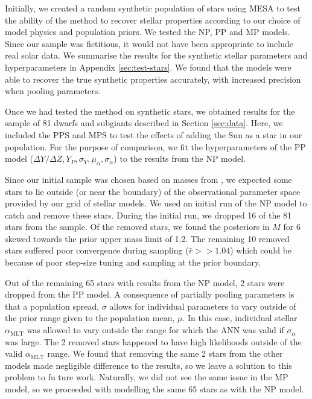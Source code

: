 \documentclass[a4paper,fleqn,usenatbib]{mnras}
\newcommand{\mlt}{\ensuremath{{\alpha_\mathrm{MLT}}}}
\begin{document}
Initially, we created a random synthetic population of stars using \textsc{MESA} to test the ability of the method to recover stellar properties according to our choice of model physics and population priors. We tested the NP, PP and MP models. Since our sample was fictitious, it would not have been appropriate to include real solar data. We summarise the results for the synthetic stellar parameters and hyperparameters in Appendix \ref{sec:test-stars}. We found that the models were able to recover the true synthetic properties accurately, with increased precision when pooling parameters.

Once we had tested the method on synthetic stars, we obtained results for the sample of 81 dwarfs and subgiants described in Section \ref{sec:data}. Here, we included the PPS and MPS to test the effects of adding the Sun as a star in our population. For the purpose of comparison, we fit the hyperparameters of the PP model ($\Delta Y/\Delta Z, Y_P, \sigma_Y, \mu_\alpha, \sigma_\alpha$) to the results from the NP model.

Since our initial sample was chosen based on masses from , we expected some stars to lie outside (or near the boundary) of the observational parameter space provided by our grid of stellar models. We used an initial run of the NP model to catch and remove these stars. During the initial run, we dropped 16 of the 81 stars from the sample. Of the removed stars, we found the posteriors in $M$ for 6 skewed towards the prior upper mass limit of \SI{1.2}{\solarmass}. The remaining 10 removed stars suffered poor convergence during sampling ($\hat{r} >> 1.04$) which could be because of poor step-size tuning and sampling at the prior boundary.

Out of the remaining 65 stars with results from the NP model, 2 stars were dropped from the PP model. A consequence of partially pooling parameters is that a population spread, $\sigma$ allows for individual parameters to vary outside of the prior range given to the population mean, $\mu$. In this case, individual stellar $\mlt$ was allowed to vary outside the range for which the ANN was valid if $\sigma_\alpha$ was large. The 2 removed stars happened to have high likelihoods outside of the valid $\mlt$ range. We found that removing the same 2 stars from the other models made negligible difference to the results, so we leave a solution to this problem to fu  ture work. Naturally, we did not see the same issue in the MP model, so we proceeded with modelling the same 65 stars as with the NP model.
\end{document}
